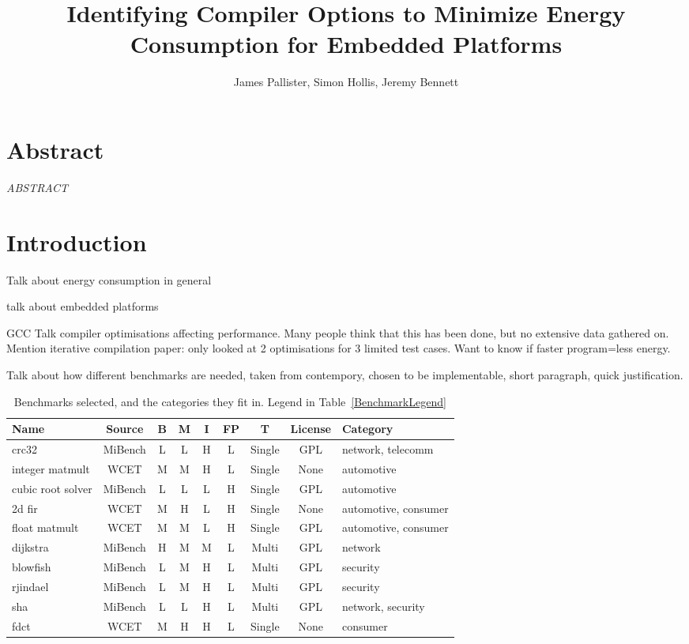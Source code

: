 \documentclass[twocolumn]{article}
\title{Identifying Compiler Options to Minimize Energy Consumption for Embedded Platforms}
\author{James Pallister, Simon Hollis, Jeremy Bennett}
\begin{document}
\maketitle
\section*{Abstract}

\textit{ABSTRACT}

\section*{Introduction}

Talk about energy consumption in general

talk about embedded platforms

GCC Talk compiler optimisations affecting performance. Many people think that this has been done, but no extensive data gathered on. Mention iterative compilation paper: only looked at 2 optimisations for 3 limited test cases. Want to know if faster program=less energy.

Talk about how different benchmarks are needed, taken from contempory, chosen to be implementable,
short paragraph, quick justification.

\begin{table*}
\centering
	\begin{tabular}{l c c c c c c c l}
	Name				 	& Source 	& B & M & I & FP& T 		& License & Category \\
	\hline
	crc32					& MiBench 	& L & L & H & L & Single 	& GPL	& network, telecomm	\\
	integer matmult			& WCET	 	& M & M & H & L & Single 	& None	& automotive	\\
	cubic root solver		& MiBench 	& L & L & L & H & Single 	& GPL	& automotive	\\
	2d fir					& WCET 		& M & H & L & H & Single 	& None	& automotive, consumer	\\
	float matmult			& WCET 		& M & M & L & H & Single 	& GPL	& automotive, consumer	\\
	dijkstra				& MiBench 	& H & M & M & L & Multi 	& GPL	& network	\\
	blowfish				& MiBench 	& L & M & H & L & Multi 	& GPL	& security	\\
	rjindael				& MiBench 	& L & M & H & L & Multi 	& GPL	& security	\\
	sha						& MiBench 	& L & L & H & L & Multi 	& GPL	& network, security	\\
	fdct					& WCET 		& M & H & H & L & Single 	& None	& consumer	\\
	\end{tabular}
\caption{Benchmarks selected, and the categories they fit in. Legend in Table~\ref{BenchmarkLegend}}
\end{table*}
\end{document}
